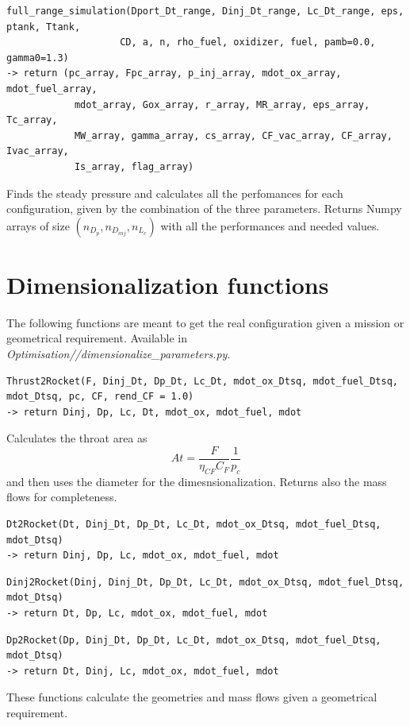 \begin{verbatim}
full_range_simulation(Dport_Dt_range, Dinj_Dt_range, Lc_Dt_range, eps, ptank, Ttank,
					CD, a, n, rho_fuel, oxidizer, fuel, pamb=0.0, gamma0=1.3)
-> return (pc_array, Fpc_array, p_inj_array, mdot_ox_array, mdot_fuel_array, 
			mdot_array, Gox_array, r_array, MR_array, eps_array, Tc_array, 
			MW_array, gamma_array, cs_array, CF_vac_array, CF_array, Ivac_array, 
			Is_array, flag_array)
\end{verbatim}
\hspace{2em} Finds the steady pressure and calculates all the perfomances for each configuration, given by the combination of the three parameters.
Returns Numpy arrays of size $(n_{D_p},n_{D_{inj}},n_{L_c})$ with all the performances and needed values.
\section{Dimensionalization functions}
The following functions are meant to get the real configuration given a mission or geometrical requirement.
Available in \textit{Optimisation//dimensionalize\_parameters.py}.

\begin{verbatim}
Thrust2Rocket(F, Dinj_Dt, Dp_Dt, Lc_Dt, mdot_ox_Dtsq, mdot_fuel_Dtsq, mdot_Dtsq, pc, CF, rend_CF = 1.0)
-> return Dinj, Dp, Lc, Dt, mdot_ox, mdot_fuel, mdot
\end{verbatim}
Calculates the throat area as
\begin{equation}
	At = \frac{F}{\eta_{CF} C_F}\frac{1}{p_c}
\end{equation}
and then uses the diameter for the dimesnsionalization. Returns also the mass flows for completeness.

\begin{verbatim}
Dt2Rocket(Dt, Dinj_Dt, Dp_Dt, Lc_Dt, mdot_ox_Dtsq, mdot_fuel_Dtsq, mdot_Dtsq)
-> return Dinj, Dp, Lc, mdot_ox, mdot_fuel, mdot
\end{verbatim}
\begin{verbatim}
Dinj2Rocket(Dinj, Dinj_Dt, Dp_Dt, Lc_Dt, mdot_ox_Dtsq, mdot_fuel_Dtsq, mdot_Dtsq)
-> return Dt, Dp, Lc, mdot_ox, mdot_fuel, mdot
\end{verbatim}
\begin{verbatim}
Dp2Rocket(Dp, Dinj_Dt, Dp_Dt, Lc_Dt, mdot_ox_Dtsq, mdot_fuel_Dtsq, mdot_Dtsq)
-> return Dt, Dinj, Lc, mdot_ox, mdot_fuel, mdot
\end{verbatim}
\hspace{2em} These functions calculate the geometries and mass flows given a geometrical requirement.

















